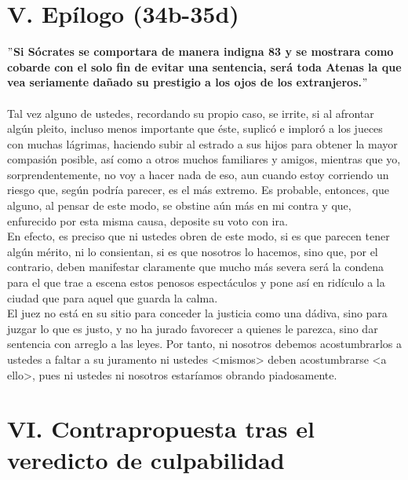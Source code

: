 \begin{multicols}{2}
\section*{\center V. Epílogo (34b-35d)}
    \textbf{$"$Si Sócrates se comportara de manera indigna 83 y se mostrara como cobarde con el solo fin de evitar una sentencia, será toda Atenas la que vea seriamente dañado su prestigio a los ojos de los extranjeros.$"$}\\\\
    Tal vez alguno de ustedes, recordando su propio caso, se irrite, si al afrontar algún pleito, incluso menos importante que éste, suplicó e imploró a los jueces con muchas lágrimas, haciendo subir al estrado a sus hijos para obtener la mayor compasión posible, así como a otros muchos familiares y amigos, mientras que yo, sorprendentemente, no voy a hacer nada de eso, aun cuando estoy corriendo un riesgo que, según podría parecer, es el más extremo. Es probable, entonces, que alguno, al pensar de este modo, se obstine aún más en mi contra y que, enfurecido por esta misma causa, deposite su voto con ira.\\
    En efecto, es preciso que ni ustedes obren de este modo, si es que parecen tener algún mérito, ni lo consientan, si es que nosotros lo hacemos, sino que, por el contrario, deben manifestar claramente que mucho más severa será la condena para el que trae a escena estos penosos espectáculos y pone así en ridículo a la ciudad que para aquel que guarda la calma.\\
    El juez no está en su sitio para conceder la justicia como una dádiva, sino para juzgar lo que es justo, y no ha jurado favorecer a quienes le parezca, sino dar sentencia con arreglo a las leyes. Por tanto, ni nosotros debemos acostumbrarlos a ustedes a faltar a su juramento ni ustedes <mismos> deben acostumbrarse <a ello>, pues ni ustedes ni nosotros estaríamos obrando piadosamente.

\section*{\center VI. Contrapropuesta tras el veredicto de culpabilidad}

\end{multicols}

